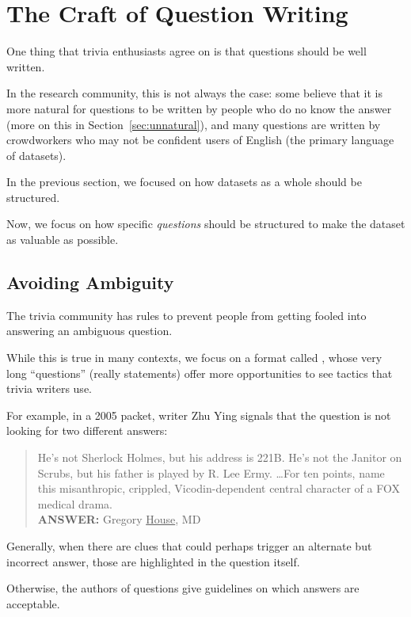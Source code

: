 \section{The Craft of Question Writing}
\label{sec:craft}

One thing that trivia enthusiasts agree on is that questions should be well written.

In the research community, this is not always the case: some believe that it is more natural for questions to be written by people who do no know the answer (more on this in Section~\ref{sec:unnatural}), and many questions are written by crowdworkers who may not be confident users of English (the primary language of  datasets).

In the previous section, we focused on how datasets as a whole should be structured.

Now, we focus on how specific \emph{questions} should be structured to make the dataset as valuable as possible.

\subsection{Avoiding Ambiguity}
\label{sec:ambiguity}

The trivia community has rules to prevent people from getting fooled
into answering an ambiguous question.

While this is true in many contexts, we focus on a format called \qb{}, whose very long ``questions'' (really statements) offer more opportunities to see tactics that trivia writers use.

For example, in a 2005  packet, writer Zhu Ying signals that the question is not looking for two different answers:
\begin{quote}
 He's not Sherlock Holmes, but his address is 221B. He's not the Janitor on Scrubs, but his father is played by R. Lee Ermy. \dots For ten points, name this misanthropic, crippled, Vicodin-dependent central character of a FOX medical drama. \\
{\bf ANSWER:} Gregory \underline{House}, MD
\end{quote}
Generally, when there are clues that could perhaps trigger an alternate but incorrect answer, those are highlighted in the question itself.

Otherwise, the authors of questions give guidelines on which answers are acceptable.  


